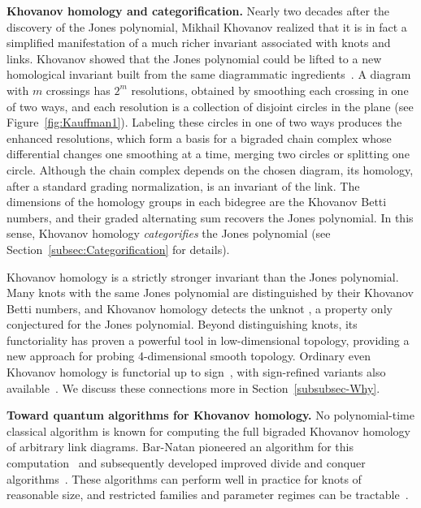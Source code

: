 \documentclass[a4paper,onecolumn,unpublished]{quantumarticle}
\theoremstyle{plain}
\theoremstyle{definition}
\theoremstyle{definition}
\numberwithin{equation}{section}
\begin{document}
\noindent \textbf{Khovanov homology and categorification.}   Nearly two decades after the discovery of the Jones polynomial, Mikhail Khovanov realized that it is in fact a simplified manifestation of a much richer invariant associated with knots and links.  Khovanov showed that the Jones polynomial could be lifted to a new homological invariant built from the same diagrammatic ingredients~\cite{Kh1}.   A diagram with $m$ crossings has $2^m$ resolutions, obtained by smoothing each crossing in one of two ways, and each resolution is a collection of disjoint circles in the plane (see Figure~\ref{fig:Kauffman1}).  Labeling these circles in one of two ways produces the enhanced resolutions, which form a basis for a bigraded chain complex whose differential changes one smoothing at a time, merging two circles or splitting one circle.  Although the chain complex depends on the chosen diagram, its homology, after a standard grading normalization, is an invariant of the link.  The dimensions of the homology groups in each bidegree are the Khovanov Betti numbers, and their graded alternating sum recovers the Jones polynomial.  In this sense, Khovanov homology \emph{categorifies} the Jones polynomial (see Section~\ref{subsec:Categorification} for details).

Khovanov homology is a strictly stronger invariant than the Jones polynomial.  Many knots with the same Jones polynomial are distinguished by their Khovanov Betti numbers, and Khovanov homology detects the unknot \cite{KM}, a property only conjectured for the Jones polynomial.  Beyond distinguishing knots, its functoriality has proven a powerful tool in low-dimensional topology, providing a new approach for probing 4-dimensional smooth topology.  Ordinary even Khovanov homology is functorial up to sign~\cite{Jacobsson2004,KhovanovTangleCobordisms2006}, with sign-refined variants also available~\cite{Blanchet2010,ClarkMorrisonWalker2009}. We discuss these connections more in Section~\ref{subsubsec-Why}.
\smallskip 

\noindent \textbf{Toward quantum algorithms for Khovanov homology.} 
No polynomial-time classical algorithm is known for computing the full bigraded Khovanov homology of arbitrary link diagrams. Bar-Natan pioneered an algorithm for this computation~\cite{BN1} and subsequently developed improved divide and conquer algorithms~\cite{BN3}. These algorithms can perform well in practice for knots of reasonable size, and restricted families and parameter regimes can be tractable~\cite{kelomaki2026}. 
\end{document}
